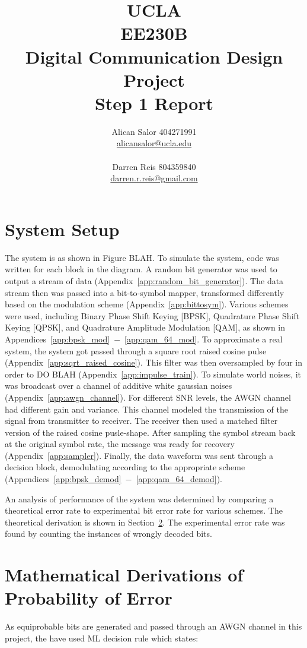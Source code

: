 \documentclass[]{article}
\title{UCLA\\EE230B\\Digital Communication Design Project\\Step 1 Report}
\author{Alican Salor 404271991 \\  \href{mailto:alicansalor@ucla.edu}{alicansalor@ucla.edu} \\ \\
Darren Reis 804359840 \\
\href{mailto:darrer.r.reis@gmail.com}{darren.r.reis@gmail.com} }
\begin{document}
\maketitle

\newpage
\tableofcontents

\newpage


\section{System Setup}
\label{sec:setup}
The system is as shown in Figure BLAH.  To simulate the system, code was written for each block in the diagram.  A random bit generator was used to output a stream of data (Appendix~\ref{app:random_bit_generator}).  The data stream then was passed into a bit-to-symbol mapper, transformed differently based on the modulation scheme (Appendix~\ref{app:bittosym}).  Various schemes were used, including Binary Phase Shift Keying [BPSK], Quadrature Phase Shift Keying [QPSK], and Quadrature Amplitude Modulation [QAM], as shown in Appendices~\ref{app:bpsk_mod}~$-$~\ref{app:qam_64_mod}. To approximate a real system, the system got passed through a square root raised cosine pulse (Appendix~\ref{app:sqrt_raised_cosine}).  This filter was then oversampled by four in order to DO BLAH (Appendix~\ref{app:impulse_train}).  To simulate world noises, it was broadcast over a channel of additive white gaussian noises (Appendix~\ref{app:awgn_channel}).  For different SNR levels, the AWGN channel had different gain and variance.  This channel modeled the transmission of the signal from transmitter to receiver.  The receiver then used a matched filter version of the raised cosine pusle-shape.  After sampling the symbol stream back at the original symbol rate, the message was ready for recovery (Appendix~\ref{app:sampler}).  Finally, the data waveform was sent through a decision block, demodulating according to the appropriate scheme (Appendices~\ref{app:bpsk_demod}~$-$~\ref{app:qam_64_demod}).  

An analysis of performance of the system was determined by comparing a theoretical error rate to experimental bit error rate for various schemes.  The theoretical derivation is shown in Section~\ref{sec:deriv}.  The experimental error rate was found by counting the instances of wrongly decoded bits.  

\newpage
\section{Mathematical Derivations of Probability of Error}
\label{sec:deriv}
As equiprobable bits are generated and passed through an AWGN channel in this project, the have used ML decision rule which states: \\
\end{document}
